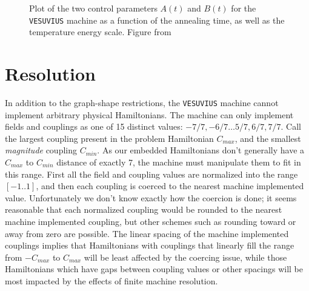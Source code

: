 \begin{figure}
	\caption[\texttt{VESUVIUS Evolution Trajectory}]{Plot of the two control parameters $A(t)$ and $B(t)$ for the \texttt{VESUVIUS} machine as a function of the annealing time, as well as the temperature energy scale.  Figure from \cite{pudenz}}
	\label{fig:trajectory}
\end{figure}

\section{Resolution}
\label{sec:resolution}
In addition to the graph-shape restrictions, the \texttt{VESUVIUS} machine cannot implement arbitrary physical Hamiltonians.  The machine can only implement fields and couplings as one of 15 distinct values: $-7/7, -6/7 \dots 5/7,6/7, 7/7$.  Call the largest coupling present in the problem Hamiltonian $C_{max}$, and the smallest \emph{magnitude} coupling $C_{min}$.  As our embedded Hamiltonians don't generally have a $C_{max}$ to $C_{min}$ distance of exactly 7, the machine must manipulate them to fit in this range.
First  all the field and coupling values are normalized into the range $[-1..1]$, and then each coupling is coerced to the nearest machine implemented value.
Unfortunately we don't know exactly how the coercion is done; it seems reasonable that each normalized coupling would be rounded to the nearest machine implemented coupling, but other schemes such as rounding toward or away from zero are possible.
The linear spacing of the machine implemented couplings implies that Hamiltonians with couplings that linearly fill the range from $-C_{max}$ to $C_{max}$ will be least affected by the coercing issue, while those Hamiltonians which have gaps between coupling values or other spacings will be most impacted by the effects of finite machine resolution.

